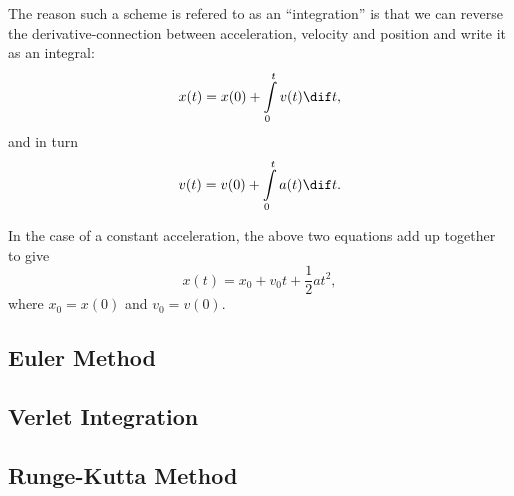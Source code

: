 The reason such a scheme is refered to as an \enquote{integration} is that we can reverse the derivative-connection between acceleration, velocity and position and write it as an integral:
\begin{equation}
  x(t) = x(0) + \int\limits_{0}^{t}v(t)\dif t,
  \label{eq:position_from_velocity}
\end{equation}
and in turn
\begin{equation}
  v(t) = v(0) + \int\limits_{0}^{t}a(t)\dif t.
  \label{eq:velocity_from_accelration}
\end{equation}

In the case of a constant acceleration, the above two equations add up together to give
\begin{equation}
  x(t) = x_{0} + v_{0}t + \frac{1}{2}at^{2},
  \label{eq:position_from_constant_acceleration}
\end{equation}
where $x_{0}=x(0)$ and $v_{0}=v(0)$.

\subsection{Euler Method}

\subsection{Verlet Integration}

\subsection{Runge-Kutta Method}
